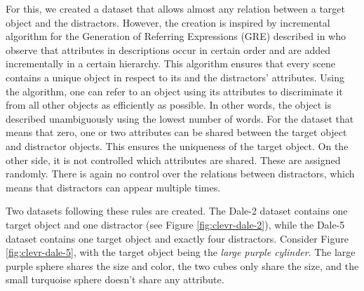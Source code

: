 For this, we created a dataset that allows almost any relation between a target object and the distractors.
However, the creation is inspired by incremental algorithm for the Generation of Referring Expressions (GRE) described in \citep{Dale1995} who observe that attributes in descriptions occur in certain order and are added incrementally in a certain hierarchy.
This algorithm ensures that every scene contains a unique object in respect to its and the distractors' attributes.
Using the algorithm, one can refer to an object using its attributes to discriminate it from all other objects as efficiently as possible.
In other words, the object is described unambiguously using the lowest number of words.
For the dataset that means that zero, one or two attributes can be shared between the target object and distractor objects.
This ensures the uniqueness of the target object.
On the other side, it is not controlled which attributes are shared.
These are assigned randomly.
There is again no control over the relations between distractors, which means that distractors can appear multiple times.

Two datasets following these rules are created.
The Dale-2 dataset contains one target object and one distractor (see Figure \ref{fig:clevr-dale-2}), while the Dale-5 dataset contains one target object and exactly four distractors.
Consider Figure \ref{fig:clevr-dale-5}, with the target object being the \emph{large purple cylinder}. The large purple sphere shares the size and color, the two cubes only share the size, and the small turquoise sphere doesn't share any attribute.

